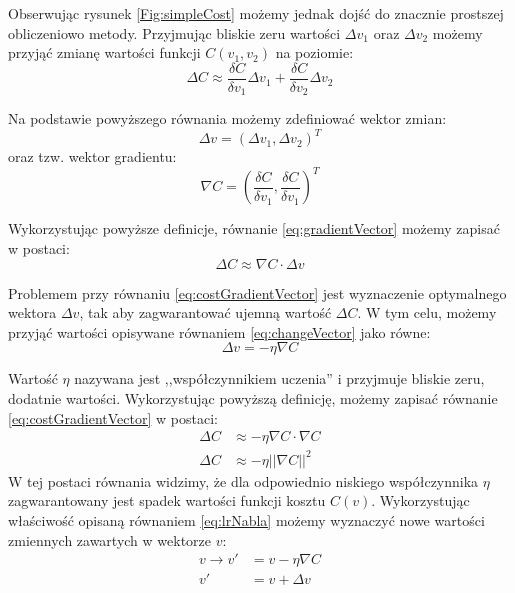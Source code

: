 \documentclass[12pt,twoside]{article}
\begin{document}
Obserwując rysunek \ref{Fig:simpleCost} możemy jednak dojść do znacznie prostszej obliczeniowo metody.
Przyjmując bliskie zeru wartości $\Delta v_1$ oraz $\Delta v_2$ możemy przyjąć zmianę wartości funkcji $C(v_1, v_2)$ na poziomie:
\begin{equation}
	\label{eq:deltaC}
	\Delta C \approx \frac{\delta C}{\delta v_1} \Delta v_1 + \frac{\delta C}{\delta v_2} \Delta v_2
\end{equation}

Na podstawie powyższego równania możemy zdefiniować wektor zmian:
\begin{equation}
	\label{eq:changeVector}
	\Delta v = (\Delta v_1, \Delta v_2)^T
\end{equation}
oraz tzw. wektor gradientu:
\begin{equation}
	\label{eq:gradientVector}
	\nabla C = \left(\frac{\delta C}{\delta v_1},\frac{\delta C}{\delta v_1}\right)^T
\end{equation}

Wykorzystując powyższe definicje, równanie \ref{eq:gradientVector} możemy zapisać w postaci:
\begin{equation}
	\label{eq:costGradientVector}
	\Delta C \approx \nabla C \cdot \Delta v
\end{equation}

Problemem przy równaniu \ref{eq:costGradientVector} jest wyznaczenie optymalnego wektora $\Delta v$, tak aby zagwarantować ujemną wartość $\Delta C$. W tym celu, możemy przyjąć wartości opisywane równaniem \ref{eq:changeVector} jako równe:
\begin{equation}
	\label{eq:lrNabla}
	\Delta v = -\eta \nabla C
\end{equation}

Wartość $\eta$ nazywana jest ,,współczynnikiem uczenia'' i przyjmuje bliskie zeru, dodatnie wartości. Wykorzystując powyższą definicję, możemy zapisać równanie \ref{eq:costGradientVector} w postaci:
\begin{equation*}
	\begin{aligned}
		\Delta C &\approx - \eta \nabla C \cdot \nabla C\\
		\Delta C &\approx - \eta ||\nabla C||^2
	\end{aligned}
\end{equation*}
W tej postaci równania widzimy, że dla odpowiednio niskiego współczynnika $\eta$ zagwarantowany jest spadek wartości funkcji kosztu $C(v)$.
Wykorzystując właściwość opisaną równaniem \ref{eq:lrNabla} możemy wyznaczyć nowe wartości zmiennych zawartych w wektorze $v$:
\begin{equation}
	\begin{aligned}
		v  \rightarrow v' &= v - \eta \nabla C \\
		v' &= v + \Delta v
	\end{aligned}
\end{equation}
\end{document}

